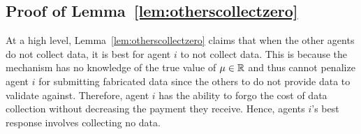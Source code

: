 \subsection{Proof of Lemma~\ref{lem:otherscollectzero}}
\label{sec:otherscollectzero}


At a high level, Lemma~\ref{lem:otherscollectzero} claims that when the other agents do not collect data, it is best for agent $i$ to not collect data. This is because the mechanism has no knowledge of the true value of $\mu\in\mathbb{R}$ and thus cannot penalize agent $i$ for submitting fabricated data since the others to do not provide data to validate against. Therefore, agent $i$ has the ability to forgo the cost of data collection without decreasing the payment they receive. Hence, agents $i$'s best response involves collecting no data. 

